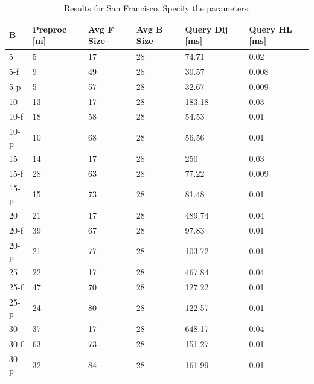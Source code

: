 \begin{table}
\begin{center}
\begin{tabular}{ | l | p{1cm} | p{1cm} | p{1cm} | p{1.2cm} | p{1.2cm} | }
\hline
	B & Preproc [m] & Avg F Size & Avg B Size & Query Dij [ms] & Query HL [ms] \\ \hline \hline
5  & 5  & 17 & 28 & 74.71  & 0.02  \\
5-f  & 9  & 49 & 28 & 30.57  & 0.008 \\
5-p  & 5  & 57 & 28 & 32.67  & 0.009 \\\hline
10 & 13 & 17 & 28 & 183.18 & 0.03  \\
10-f & 18 & 58 & 28 & 54.53  & 0.01  \\
10-p & 10 & 68 & 28 & 56.56  & 0.01  \\\hline
15 & 14 & 17 & 28 & 250    & 0.03  \\
15-f & 28 & 63 & 28 & 77.22  & 0.009 \\
15-p & 15 & 73 & 28 & 81.48  & 0.01  \\\hline
20 & 21 & 17 & 28 & 489.74 & 0.04  \\
20-f & 39 & 67 & 28 & 97.83  & 0.01  \\
20-p & 21 & 77 & 28 & 103.72 & 0.01  \\\hline
25 & 22 & 17 & 28 & 467.84 & 0.04  \\
25-f & 47 & 70 & 28 & 127.22 & 0.01  \\
25-p & 24 & 80 & 28 & 122.57 & 0.01  \\\hline
30 & 37 & 17 & 28 & 648.17 & 0.04  \\
30-f & 63 & 73 & 28 & 151.27 & 0.01  \\
30-p & 32 & 84 & 28 & 161.99 & 0.01  \\\hline
\end{tabular}
\caption{Results for San Francisco. Specify the parameters. }\label{tab:sf_results}
\end{center}
\end{table}


